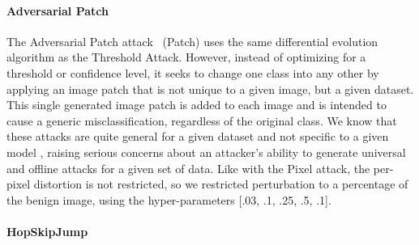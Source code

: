 \documentclass[lettersize,journal]{IEEEtran}
\begin{document}
\paragraph{Adversarial Patch}

The Adversarial Patch attack~\cite{adversarialpatch} (Patch) uses the same differential evolution algorithm as the Threshold Attack. However, instead of optimizing for a threshold or confidence level, it seeks to change one class into any other by applying an image patch that is not unique to a given image, but a given dataset. This single generated image patch is added to each image and is intended to cause a generic misclassification, regardless of the original class.  We know that these attacks are quite general for a given dataset and not specific to a given model \cite{adversarialpatch, xiao2021improving}, raising serious concerns about an attacker's ability to generate universal and offline attacks for a given set of data. Like with the Pixel attack, the per-pixel distortion is not restricted, so we restricted perturbation to a percentage of the benign image, using the hyper-parameters [.03, .1, .25, .5, .1].



\paragraph{HopSkipJump}
\end{document}
